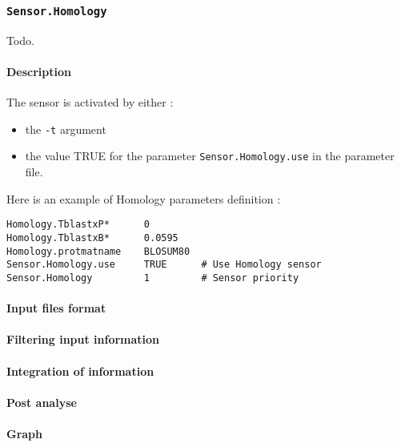 
\subsubsection{\texttt{Sensor.Homology}}

Todo.

\paragraph{Description}

The sensor is activated by either :
\begin{itemize}
\item the \texttt{-t} argument 
\item the value TRUE for the parameter \texttt{Sensor.Homology.use} in the
  parameter file.
\end{itemize}
Here is an example of Homology parameters definition :
\begin{Verbatim}[fontsize=\small]
Homology.TblastxP*      0
Homology.TblastxB*      0.0595
Homology.protmatname    BLOSUM80
Sensor.Homology.use     TRUE      # Use Homology sensor
Sensor.Homology         1         # Sensor priority
\end{Verbatim}

\paragraph{Input files format}

\paragraph{Filtering input information}

\paragraph{Integration of information}

\paragraph{Post analyse}

\paragraph{Graph}

